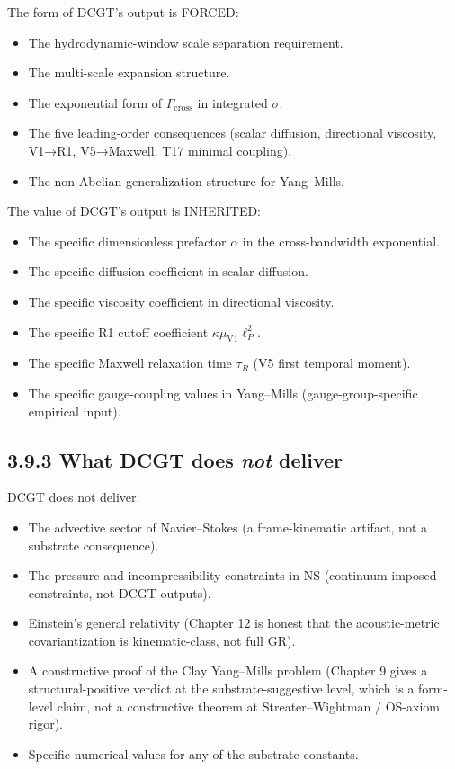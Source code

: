 \documentclass[11pt]{book}
\begin{document}
The form of DCGT's output is FORCED:
\begin{itemize}
\item The hydrodynamic-window scale separation requirement.
\item The multi-scale expansion structure.
\item The exponential form of $\Gamma_\mathrm{cross}$ in integrated $\sigma$.
\item The five leading-order consequences (scalar diffusion, directional viscosity, V1→R1, V5→Maxwell, T17 minimal coupling).
\item The non-Abelian generalization structure for Yang–Mills.
\end{itemize}

The value of DCGT's output is INHERITED:
\begin{itemize}
\item The specific dimensionless prefactor $\alpha$ in the cross-bandwidth exponential.
\item The specific diffusion coefficient in scalar diffusion.
\item The specific viscosity coefficient in directional viscosity.
\item The specific R1 cutoff coefficient $\kappa\mu_\mathrm{V1}\ell_P^2$.
\item The specific Maxwell relaxation time $\tau_R$ (V5 first temporal moment).
\item The specific gauge-coupling values in Yang–Mills (gauge-group-specific empirical input).
\end{itemize}

\subsection{3.9.3 What DCGT does \textit{not} deliver}

DCGT does not deliver:
\begin{itemize}
\item The advective sector of Navier–Stokes (a frame-kinematic artifact, not a substrate consequence).
\item The pressure and incompressibility constraints in NS (continuum-imposed constraints, not DCGT outputs).
\item Einstein's general relativity (Chapter 12 is honest that the acoustic-metric covariantization is kinematic-class, not full GR).
\item A constructive proof of the Clay Yang–Mills problem (Chapter 9 gives a structural-positive verdict at the substrate-suggestive level, which is a form-level claim, not a constructive theorem at Streater–Wightman / OS-axiom rigor).
\item Specific numerical values for any of the substrate constants.
\end{itemize}
\end{document}
